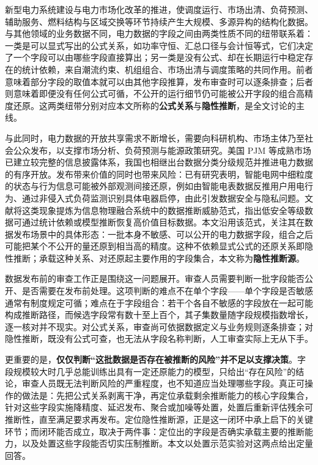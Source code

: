 \documentclass[UTF8,zihao=5,twoside]{ctexart}
\begin{document}
新型电力系统建设与电力市场化改革的推进，使调度运行、市场出清、负荷预测、辅助服务、燃料结构与区域交换等环节持续产生大规模、多源异构的结构化数据\cite{ref-liu-cps,ref-ma-pjm}。与其他领域的业务数据不同，电力数据的字段之间由两类性质不同的纽带联系着：一类是可以显式写出的公式关系，如功率守恒、汇总口径与会计恒等式，它们决定了一个字段可以由哪些字段直接算出；另一类是没有公式、却在长期运行中稳定存在的统计依赖，来自潮流约束、机组组合、市场出清与调度策略的共同作用。前者意味着部分字段的取值本就可以由其他字段推算，发布审查时可以逐条排查；后者则意味着即便没有任何公式可循，不公开的运行细节仍可能被公开字段的组合高精度还原。这两类纽带分别对应本文所称的\textbf{公式关系}与\textbf{隐性推断}，是全文讨论的主线。

与此同时，电力数据的开放共享需求不断增长，需要向科研机构、市场主体乃至社会公众发布，以支撑市场分析、负荷预测与能源政策研究\cite{ref-zhu-sharing}。美国 PJM 等成熟市场已建立较完整的信息披露体系\cite{ref-ma-pjm,ref-pjm-dataminer}，我国也相继出台数据分类分级规范并推进电力数据的有序开放\cite{ref-gbt-classify}。发布带来价值的同时也带来风险：已有研究表明，智能电网中细粒度的状态与行为信息可能被外部观测间接还原，例如由智能电表数据反推用户用电行为\cite{ref-sankar,ref-giaconi}、通过非侵入式负荷监测识别具体电器启停\cite{ref-chen-privacy,ref-wang-meter}，由此引发数据安全与隐私问题\cite{ref-adewole,ref-zhang-sgcc}。文献\cite{ref-liu-data-inference}将这类现象提炼为信息物理融合系统中的数据推断威胁范式，指出低安全等级数据可通过统计依赖或模型推断恢复高价值目标数据。本文沿用该范式，关注其在数据发布场景中的具体形态：一批本身不敏感、可以公开的电力数据字段，组合之后可能把某个不公开的量还原到相当高的精度。这种不依赖显式公式的还原关系即隐性推断；承载这种关系、对还原起主要作用的字段集合，本文称为\textbf{隐性推断源}。

数据发布前的审查工作正是围绕这一问题展开。审查人员需要判断一批字段能否公开、是否需要在发布前处理。这项判断的难点不在单个字段——单个字段是否敏感通常有制度规定可循；难点在于字段组合：若干个各自不敏感的字段放在一起可能构成推断路径，而候选字段常有数十至上百个，其子集数量随字段规模指数增长，逐一核对并不现实。对公式关系，审查尚可依据数据定义与业务规则逐条排查；对隐性推断，既没有公式可查，也无法从字段名称判断，人工审查实际上无从下手。

更重要的是，\textbf{仅仅判断“这批数据是否存在被推断的风险”并不足以支撑决策}。字段规模较大时几乎总能训练出具有一定还原能力的模型，只给出“存在风险”的结论，审查人员既无法判断风险的严重程度，也不知道应当处理哪些字段。真正可操作的做法是：先把公式关系剥离干净，再定位承载剩余推断能力的核心字段集合，针对这些字段实施降精度、延迟发布、聚合或加噪等处置，处置后重新评估残余可推断性，直至满足要求再发布。定位隐性推断源，正是这一闭环中承上启下的关键环节；而闭环能否成立，取决于两件事：定位出的字段是否确实承载主要的推断能力，以及处置这些字段能否切实压制推断。本文以处置示范实验对这两点给出定量回答。
\end{document}
